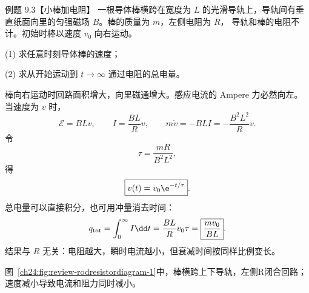 \begin{origexamplebox}{例题 9.3【小棒加电阻】}
一根导体棒横跨在宽度为 $L$ 的光滑导轨上，导轨间有垂直纸面向里的匀强磁场 $B$。棒的质量为 $m$，左侧电阻为 $R$，
导轨和棒的电阻不计。初始时棒以速度 $v_0$ 向右运动。

(1) 求任意时刻导体棒的速度；

(2) 求从开始运动到 $t\to\infty$ 通过电阻的总电量。

%
\begin{center}\end{center}
\label{fig:em24-question-3}
\end{origexamplebox}

\begin{xesolution}
棒向右运动时回路面积增大，向里磁通增大。感应电流的 Ampere 力必然向左。当速度为 $v$ 时，
\begin{equation}
  \mathcal E=BLv,
  \qquad I=\frac{BL}{R}v,
  \qquad m\dot v=-BLI=-\frac{B^2L^2}{R}v.
\end{equation}
令
\begin{equation}
  \tau=\frac{mR}{B^2L^2},
\end{equation}
得
\begin{equation}
  \boxed{v(t)=v_0\e^{-t/\tau}}.
\end{equation}
总电量可以直接积分，也可用冲量消去时间：
\begin{equation}
  q_{\rm tot}=\int_0^\infty I\dd t
  =\frac{BL}{R}v_0\tau
  =\boxed{\frac{mv_0}{BL}}.
\end{equation}
结果与 $R$ 无关：电阻越大，瞬时电流越小，但衰减时间按同样比例变长。

图~\ref{ch24:fig:review-rodresistordiagram-1}中，棒横跨上下导轨，左侧R闭合回路；速度减小导致电流和阻力同时减小。
\par\noindent\begin{minipage}{\linewidth}
\rodResistorDiagram
{}\label{ch24:fig:review-rodresistordiagram-1}
\end{minipage}\par\medskip
\end{xesolution}

